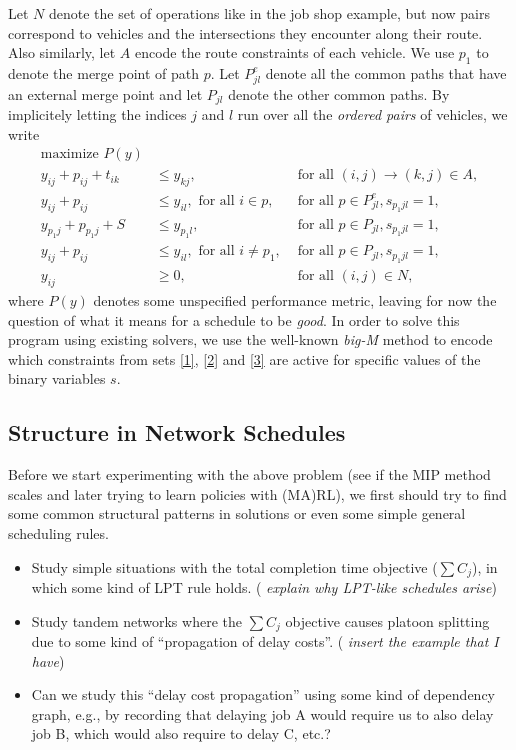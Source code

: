 \documentclass{article}
\theoremstyle{definition}
\theoremstyle{plain}
\begin{document}
Let $N$ denote the set of operations like in the job shop example, but now pairs
correspond to vehicles and the intersections they encounter along their route.
Also similarly, let $A$ encode the route constraints of each vehicle. We use
$p_{1}$ to denote the merge point of path $p$. Let $P_{jl}^{e}$ denote all the
common paths that have an external merge point and let $P_{jl}$ denote the other
common paths. By implicitely letting the indices $j$ and $l$ run over all the
\textit{ordered pairs} of vehicles, we write
%
\begin{subequations}
\begin{align}
  \text{maximize } P(y) \\
  y_{ij} + p_{ij} + t_{ik} &\leq y_{kj}, & \text{ for all } (i,j) \xrightarrow{} (k,j) \in A, \\
  \label{1} y_{ij} + p_{ij} &\leq y_{il}, \text{ for all } i \in p, &\text{ for all } p \in P_{jl}^{e}, s_{p_{1}jl} = 1, \\
  \label{2} y_{p_{1}j} + p_{p_{1}j} + S &\leq y_{p_{1}l},  &\text{ for all } p \in P_{jl}, s_{p_{1}jl} = 1, \\
  \label{3} y_{ij} + p_{ij} &\leq y_{il}, \text{ for all } i \neq p_{1}, &\text{ for all } p \in P_{jl}, s_{p_{1}jl} = 1, \\
  y_{ij} &\geq 0, & \text{ for all } (i,j) \in N ,
\end{align}
\end{subequations}
where $P(y)$ denotes some unspecified performance metric, leaving for now the
question of what it means for a schedule to be \textit{good}.
In order to solve this program using existing solvers, we use the well-known
\textit{big-M} method to encode which constraints from sets \eqref{1}, \eqref{2}
and \eqref{3} are active for specific values of the binary variables $s$.


\subsection{Structure in Network Schedules}

Before we start experimenting with the above problem (see if the MIP method
scales and later trying to learn policies with (MA)RL), we first should try to
find some common structural patterns in solutions or even some simple general
scheduling rules.

\begin{itemize}
  \item Study simple situations with the total completion time objective ($\sum C_{j}$), in which some kind of LPT rule holds. (\textit{\color{blue} explain why LPT-like schedules arise})
  \item Study tandem networks where the $\sum C_{j}$ objective causes platoon splitting due to some kind of ``propagation of delay costs''. (\textit{\color{blue} insert the example that I have})
  \item Can we study this ``delay cost propagation'' using some kind of dependency graph, e.g., by recording that delaying job A would require us to also delay job B, which would also require to delay C, etc.?
\end{itemize}
\end{document}
